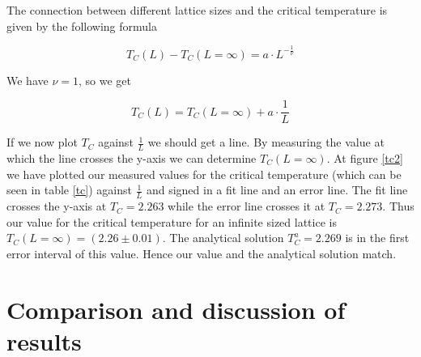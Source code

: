 \documentclass[10pt,a4paper]{article}
\begin{document}

The connection between different lattice sizes and the critical temperature is given by the following formula

\begin{equation}
T_C(L) - T_C(L = \infty) = a \cdot L^{-\frac{1}{\nu}}
\end{equation}

We have $\nu = 1$, so we get

\begin{equation}
T_C(L) = T_C(L = \infty) + a \cdot \frac{1}{L}
\end{equation}

If we now plot $T_C$ against $\frac{1}{L}$ we should get a line. By measuring the value at which the line crosses the y-axis we can determine $T_C(L = \infty)$. At figure \ref*{tc2} we have plotted our measured values for the critical temperature (which can be seen in table \ref*{tc}) against $\frac{1}{L}$ and signed in a fit line and an error line. The fit line crosses the y-axis at $T_C = 2.263$ while the error line crosses it at $T_C = 2.273$. Thus our value for the critical temperature for an infinite sized lattice is $T_C(L = \infty) = (2.26 \pm 0.01)$. The analytical solution $T_C^{a} = 2.269$ is in the first error interval of this value. Hence our value and the analytical solution match.


\clearpage

\section{Comparison and discussion of results}
\end{document}

